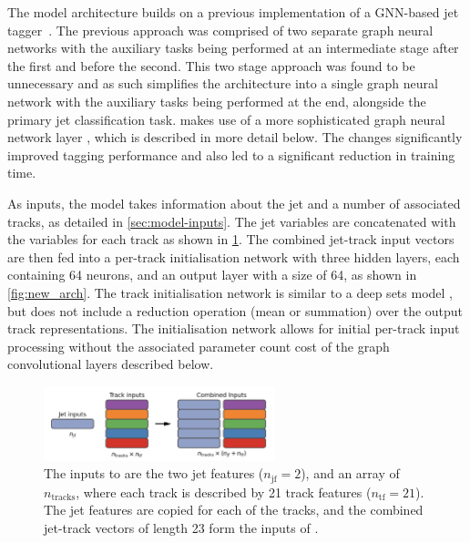 The model architecture builds on a previous implementation of a GNN-based jet tagger~\cite{serviansky2020set2graph}.
The previous approach was comprised of two separate graph neural networks with the auxiliary tasks being performed at an intermediate stage after the first and before the second.
This two stage approach was found to be unnecessary and as such \GNN simplifies the architecture into a single graph neural network with the auxiliary tasks being performed at the end, alongside the primary jet classification task.
\GNN makes use of a more sophisticated graph neural network layer \cite{2021arXiv210514491B}, which is described in more detail below.
The changes significantly improved tagging performance and also led to a significant reduction in training time.

As inputs, the model takes information about the jet and a number of associated tracks, as detailed in \cref{sec:model-inputs}.
The jet variables are concatenated with the variables for each track as shown in \cref{fig:model_input_array}.
The combined jet-track input vectors are then fed into a per-track initialisation network with three hidden layers, each containing 64 neurons, and an output layer with a size of 64, as shown in \cref{fig:new_arch}. 
The track initialisation network is similar to a deep sets model \cite{zaheer2018deep}, but does not include a reduction operation (mean or summation) over the output track representations.
The initialisation network allows for initial per-track input processing without the associated parameter count cost of the graph convolutional layers described below. 

\begin{figure}[!htbp]
    \centering
    \includegraphics[width=0.6\textwidth]{chapters/gnn_tagger/figs/inputs_diagram.png}
    \caption{The inputs to \GNN are the two jet features ($n_\text{jf} = 2$), and an array of $n_{\text{tracks}}$, where each track is described by 21 track features ($n_\text{tf} = 21$). The jet features are copied for each of the tracks, and the combined jet-track vectors of length 23 form the inputs of \GNN \cite{ATL-PHYS-PUB-2022-027}.}
    \label{fig:model_input_array}
\end{figure}

